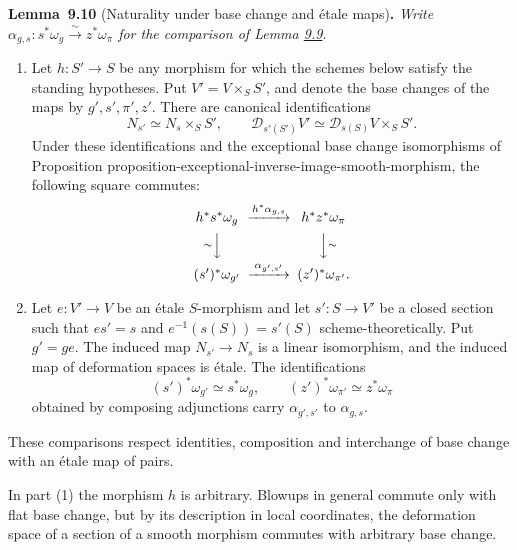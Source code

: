 \documentclass[11pt]{article}
\newenvironment{bpstatement}[2]{\par\addvspace{0.6\baselineskip}\noindent\textbf{#1}#2\textbf{.}\enspace\ignorespaces}
  {\par\addvspace{0.4\baselineskip}}
\newenvironment{bpstatementit}[2]{\begin{bpstatement}{#1}{#2}\itshape\ignorespaces}{\end{bpstatement}}
\begin{document}
\label{bp30}%
\begin{bpstatementit}{Lemma~9.10}{ (Naturality under base change and étale maps)}
Write \(\alpha_{g,s}:s^*\omega_g\xrightarrow{\sim}z^*\omega_\pi\) for the comparison of Lemma \hyperref[bp27]{9.9}.

\begin{enumerate}
\item Let \(h:S'\to S\) be any morphism for which the schemes below satisfy the standing hypotheses. Put \(V'=V\times_SS'\), and denote the base changes of the maps by \(g',s',\pi',z'\). There are canonical identifications \[
   N_{s'}\simeq N_s\times_SS',\qquad
   \mathcal D_{s'(S')}V'
   \simeq\mathcal D_{s(S)}V\times_SS'.
   \] Under these identifications and the exceptional base change isomorphisms of Proposition proposition-exceptional-inverse-image-smooth-morphism, the following square commutes: \[
   \begin{CD}
   h^*s^*\omega_g @>{h^*\alpha_{g,s}}>> h^*z^*\omega_\pi\\
   @V{\sim}VV @VV{\sim}V\\
   (s')^*\omega_{g'} @>{\alpha_{g',s'}}>> (z')^*\omega_{\pi'}.
   \end{CD}
   \]
\item Let \(e:V'\to V\) be an étale \(S\)-morphism and let \(s':S\to V'\) be a closed section such that \(es'=s\) and \(e^{-1}(s(S))=s'(S)\) scheme-theoretically. Put \(g'=ge\). The induced map \(N_{s'}\to N_s\) is a linear isomorphism, and the induced map of deformation spaces is étale. The identifications \[
   (s')^*\omega_{g'}\simeq s^*\omega_g,\qquad
   (z')^*\omega_{\pi'}\simeq z^*\omega_\pi
   \] obtained by composing adjunctions carry \(\alpha_{g',s'}\) to \(\alpha_{g,s}\).
\end{enumerate}

These comparisons respect identities, composition and interchange of base change with an étale map of pairs.
\end{bpstatementit}

\label{bp31}%
In part (1) the morphism \(h\) is arbitrary. Blowups in general commute only with flat base change, but by its description in local coordinates, the deformation space of a section of a smooth morphism commutes with arbitrary base change.
\end{document}
